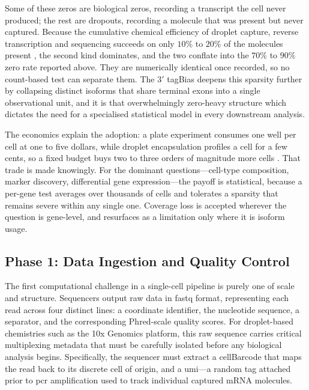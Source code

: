 Some of these zeros are biological zeros, recording a transcript the cell never produced; the rest are \glspl{dropout}, recording a molecule that was present but never captured. Because the cumulative chemical efficiency of droplet capture, reverse transcription and sequencing succeeds on only $10\%$ to $20\%$ of the molecules present \cite{jiang2022statistics}, the second kind dominates, and the two conflate into the $70\%$ to $90\%$ zero rate reported above. They are numerically identical once recorded, so no count-based test can separate them. The $3'$ \gls{tagBias} deepens this sparsity further by collapsing distinct isoforms that share terminal exons into a single observational unit, and it is that overwhelmingly zero-heavy structure which dictates the need for a specialised statistical model in every downstream analysis.

The economics explain the adoption: a plate experiment consumes one well per cell at one to five dollars, while droplet encapsulation profiles a cell for a few cents, so a fixed budget buys two to three orders of magnitude more cells \cite{conte2024opportunities}. That trade is made knowingly. For the dominant questions---cell-type composition, marker discovery, differential gene expression---the payoff is statistical, because a per-gene test averages over thousands of cells and tolerates a sparsity that remains severe within any single one. Coverage loss is accepted wherever the question is gene-level, and resurfaces as a limitation only where it is isoform usage.

\subsection{Phase 1: Data Ingestion and Quality Control}

The first computational challenge in a single-cell pipeline is purely one of scale and structure. Sequencers output raw data in \gls{fastq} format, representing each read across four distinct lines: a coordinate identifier, the nucleotide sequence, a separator, and the corresponding Phred-scale quality scores. For droplet-based chemistries such as the 10x Genomics platform, this raw sequence carries critical multiplexing metadata that must be carefully isolated before any biological analysis begins. Specifically, the sequencer must extract a \gls{cellBarcode} that maps the read back to its discrete cell of origin, and a \gls{umi}---a random tag attached prior to \gls{pcr} amplification used to track individual captured mRNA molecules.


